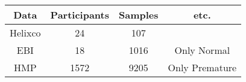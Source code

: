 \begin{tabular}{c|ccc}
    Data & Participants & Samples & etc. \\ \hline
    Helixco & 24 & 107 &  \\
    EBI & 18 & 1016 & Only Normal \\
    HMP & 1572 & 9205 & Only Premature \\
\end{tabular}